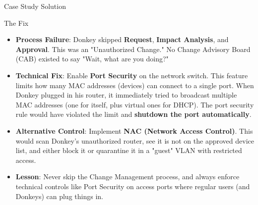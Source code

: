 \documentclass[aspectratio=169]{beamer}  %
\begin{document}
\begin{frame}{Case Study Solution}
    \begin{exampleblock}{The Fix}
        \footnotesize
        \begin{itemize}
            \item \textbf{Process Failure}: Donkey skipped \textbf{Request}, \textbf{Impact Analysis}, and \textbf{Approval}. This was an "Unauthorized Change." No Change Advisory Board (CAB) existed to say "Wait, what are you doing?"
            
            \item \textbf{Technical Fix}: Enable \textbf{Port Security} on the network switch. This feature limits how many MAC addresses (devices) can connect to a single port. When Donkey plugged in his router, it immediately tried to broadcast multiple MAC addresses (one for itself, plus virtual ones for DHCP). The port security rule would have violated the limit and \textbf{shutdown the port automatically}.
            
            \item \textbf{Alternative Control}: Implement \textbf{NAC (Network Access Control)}. This would scan Donkey's unauthorized router, see it is not on the approved device list, and either block it or quarantine it in a "guest" VLAN with restricted access.
            
            \item \textbf{Lesson}: Never skip the Change Management process, and always enforce technical controls like Port Security on access ports where regular users (and Donkeys) can plug things in.
        \end{itemize}
    \end{exampleblock}
\end{frame}


\end{document}
